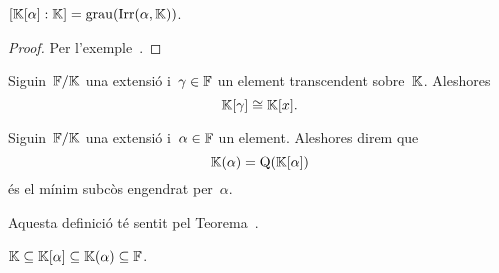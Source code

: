 \documentclass[../../main.tex]{subfiles}
\begin{document}
    \begin{corollary}
        \label{cor:grau d'un mínim subanell engendrat per un element d'una extensió}
        \([\mathbb{K}[\alpha]:\mathbb{K}]=\operatorname{grau}(\operatorname{Irr}(\alpha,\mathbb{K}))\).
        \begin{proof}
            Per l'exemple~.
        \end{proof}
    \end{corollary}
    \begin{corollary}
        \label{cor:el mínim subanell engendrat per un transcendent és isomorfa a l'anell de polinomis}
        Siguin~\(\mathbb{F}/\mathbb{K}\) una extensió i~\(\gamma\in\mathbb{F}\) un element transcendent sobre~\(\mathbb{K}\).
        Aleshores
        \[
            \mathbb{K}[\gamma]\cong\mathbb{K}[x].
        \]
    \end{corollary}
    \begin{definition}
        \label{def:mínim subcòs engendrat per un element d'una extensió}
        Siguin~\(\mathbb{F}/\mathbb{K}\) una extensió i~\(\alpha\in\mathbb{F}\) un element.
        Aleshores direm que
        \[
            \mathbb{K}(\alpha)=\operatorname{Q}(\mathbb{K}[\alpha])
        \]
        és el mínim subcòs engendrat per~\(\alpha\).

        Aquesta definició té sentit pel Teorema~.
    \end{definition}
    \begin{observation}
        \label{obs:inclusió del mínim subanell i subcòs engendrats per un element}
        \(\mathbb{K}\subseteq\mathbb{K}[\alpha]\subseteq\mathbb{K}(\alpha)\subseteq\mathbb{F}\).
    \end{observation}
\end{document}
